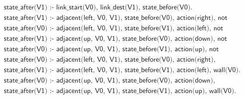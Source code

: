 \begin{equation}
\begin{split}
&\textsf{state\_after(V1) :- link\_start(V0), link\_dest(V1), state\_before(V0).}\\
&\textsf{state\_after(V1) :- adjacent(left, V0, V1), state\_before(V0), action(right), not wall(V1).}\\
&\textsf{state\_after(V0) :- adjacent(left, V0, V1), state\_before(V1), action(left), not wall(V0).}\\
&\textsf{state\_after(V1) :- adjacent(up, V0, V1), state\_before(V0), action(down), not wall(V1).}\\
&\textsf{state\_after(V0) :- adjacent(up, V0, V1), state\_before(V1), action(up), not wall(V0).}\\
&\textsf{state\_after(V0) :- adjacent(left, V0, V1), state\_before(V0), action(right), wall(V1).}\\
&\textsf{state\_after(V1) :- adjacent(left, V0, V1), state\_before(V1), action(left), wall(V0).}\\
&\textsf{state\_after(V0) :- adjacent(up, V0, V1), state\_before(V0), action(down), wall(V1).}\\
&\textsf{state\_after(V1) :- adjacent(up, V0, V1), state\_before(V1), action(up), wall(V0).}
\end{split}
\label{experiment4_ilasp}
\end{equation}
